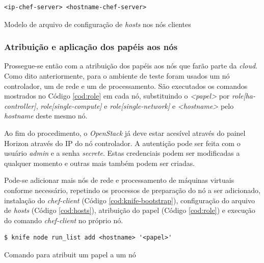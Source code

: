 \begin{listing}
\begin{verbatim}
<ip-chef-server> <hostname-chef-server>
\end{verbatim}
\caption{Modelo de arquivo de configuração de \emph{hosts} nos nós clientes}
\label{cod:hosts}
\end{listing}

\subsubsection{Atribuição e aplicação dos papéis aos nós}

Prossegue-se então com a atribuição dos papéis aos nós que farão parte da
\emph{cloud}. Como dito anteriormente, para o ambiente de teste foram usados
um nó controlador, um de rede e um de processamento. São executados os comandos
mostrados no Código \ref{cod:role} em cada nó, substituindo o \emph{\textless papel\textgreater}
por \emph{role[ha-controller]}, \emph{role[single-compute]} e \emph{role[single-network]}
e \emph{\textless hostname\textgreater} pelo \emph{hostname} deste mesmo nó.

Ao fim do procedimento, o \emph{OpenStack} já deve estar acesível através do
painel Horizon através do IP do nó controlador. A autentição pode ser feita
com o usuário \emph{admin} e a senha \emph{secrete}. Estas credenciais podem
ser modificadas a qualquer momento e outras mais também podem ser criadas.

Pode-se adicionar mais nós de rede e processamento de máquinas virtuais
conforme necessário, repetindo os processos de preparação do nó a ser adicionado,
instalação do \emph{chef-client} (Código \ref{cod:knife-bootstrap}),
configuração do arquivo de \emph{hosts} (Código \ref{cod:hosts}), atribuição
do papel (Código \ref{cod:role}) e execução do comando \emph{chef-client} no
próprio nó.

\begin{listing}
\begin{verbatim}
$ knife node run_list add <hostname> '<papel>'
\end{verbatim}
\caption{Comando para atribuit um papel a um nó}
\label{cod:role}
\end{listing}
